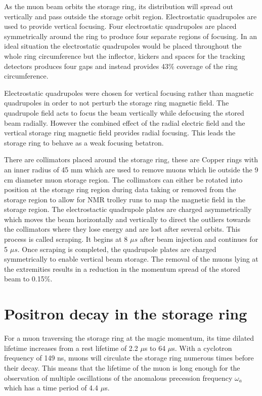 As the muon beam orbits the storage ring, its distribution will spread out vertically and pass outside the storage orbit region. Electrostatic quadrupoles are used to provide vertical focusing. Four electrostatic quadrupoles are placed symmetrically around the ring to produce four separate regions of focusing. In an ideal situation the electrostatic quadrupoles would be placed throughout the whole ring circumference but the inflector, kickers and spaces for the tracking detectors produces four gaps and instead provides 43$\%$ coverage of the ring circumference.

Electrostatic quadrupoles were chosen for vertical focusing rather than magnetic quadrupoles in order to not perturb the storage ring magnetic field. The quadrupole field acts to focus the beam vertically while defocusing the stored beam radially. However the combined effect of the radial electric field and the vertical storage ring magnetic field provides radial focusing. This leads the storage ring to behave as a weak focusing betatron.

There are collimators placed around the storage ring, these are Copper rings with an inner radius of 45 mm which are used to remove muons which lie outside the 9 cm diameter muon storage region. The collimators can either be rotated into position at the storage ring region during data taking or removed from the storage region to allow for NMR trolley runs to map the magnetic field in the storage region. The electrostactic quadrupole plates are charged asymmetrically which moves the beam horizontally and vertically to direct the outliers towards the collimators where they lose energy and are lost after several orbits. This process is called scraping. It begins at 8 $\mu{s}$ after beam injection and continues for 5 $\mu{s}$. Once scraping is completed, the quadrupole plates are charged symmetrically to enable vertical beam storage. The removal of the muons lying at the extremities results in a reduction in the momentum spread of the stored beam to 0.15$\%$.

\section{Positron decay in the storage ring}

For a muon traversing the storage ring at the magic momentum, its time dilated lifetime increases from a rest lifetime of 2.2 $\mu$s to 64 $\mu$s. With a cyclotron frequency of 149 ns, muons will circulate the storage ring numerous times before their decay. This means that the lifetime of the muon is long enough for the observation of multiple oscillations of the anomalous precession frequency $\omega_{a}$ which has a time period of 4.4 $\mu$s.

